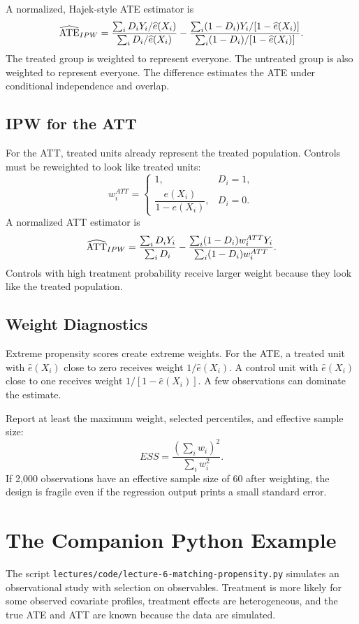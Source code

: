 A normalized, Hajek-style ATE estimator is
\[
    \widehat{\mathrm{ATE}}_{IPW}
    =
    \frac{\sum_i D_iY_i/\widehat e(X_i)}
         {\sum_i D_i/\widehat e(X_i)}
    -
    \frac{\sum_i (1-D_i)Y_i/[1-\widehat e(X_i)]}
         {\sum_i (1-D_i)/[1-\widehat e(X_i)]}.
\]
The treated group is weighted to represent everyone. The untreated group is
also weighted to represent everyone. The difference estimates the ATE under
conditional independence and overlap.

\subsection{IPW for the ATT}

For the ATT, treated units already represent the treated population. Controls
must be reweighted to look like treated units:
\[
    w_i^{ATT}
    =
    \begin{cases}
      1, & D_i=1,\\
      \dfrac{e(X_i)}{1-e(X_i)}, & D_i=0.
    \end{cases}
\]
A normalized ATT estimator is
\[
    \widehat{\mathrm{ATT}}_{IPW}
    =
    \frac{\sum_i D_iY_i}{\sum_iD_i}
    -
    \frac{\sum_i (1-D_i)w_i^{ATT}Y_i}
         {\sum_i(1-D_i)w_i^{ATT}}.
\]
Controls with high treatment probability receive larger weight because they
look like the treated population.

\subsection{Weight Diagnostics}

Extreme propensity scores create extreme weights. For the ATE, a treated unit
with \(\widehat e(X_i)\) close to zero receives weight \(1/\widehat e(X_i)\).
A control unit with \(\widehat e(X_i)\) close to one receives weight
\(1/[1-\widehat e(X_i)]\). A few observations can dominate the estimate.

Report at least the maximum weight, selected percentiles, and effective sample
size:
\[
    ESS = \frac{(\sum_i w_i)^2}{\sum_i w_i^2}.
\]
If 2,000 observations have an effective sample size of 60 after weighting, the
design is fragile even if the regression output prints a small standard error.

\section{The Companion Python Example}

The script \texttt{lectures/code/lecture-6-matching-propensity.py} simulates an
observational study with selection on observables. Treatment is more likely for
some observed covariate profiles, treatment effects are heterogeneous, and the
true ATE and ATT are known because the data are simulated.

